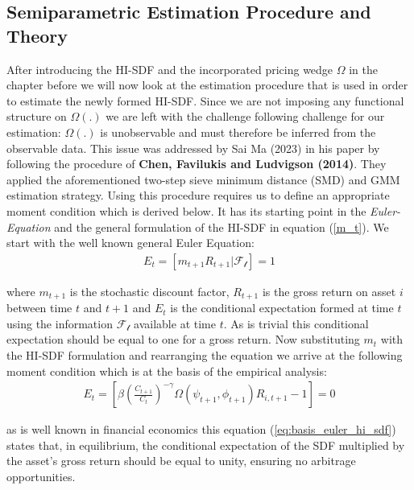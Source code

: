 \documentclass[12pt,a4paper]{article}
\begin{document}
	



	\subsection{Semiparametric Estimation Procedure and Theory}

	After introducing the HI-SDF and the incorporated pricing wedge $\Omega$ in the chapter before we will now look at the estimation procedure that is used in order to estimate the newly formed HI-SDF. Since we are not imposing any functional structure on $\Omega(.)$ we are left with the challenge following challenge for our estimation: $\Omega(.)$ is unobservable and must therefore be inferred from the observable data. This issue was addressed by Sai Ma (2023) in his paper by following the procedure of \textbf{Chen, Favilukis and Ludvigson (2014)}. They applied the aforementioned two-step sieve minimum distance (SMD) and GMM estimation strategy. Using this procedure requires us to define an appropriate moment condition which is derived below. It has its starting point in the \textit{Euler-Equation} and the general formulation of the HI-SDF in equation (\ref{m_t}). 
	We start with the well known general Euler Equation:
	\begin{align}
	E_t = [m_{t+1} R_{t+1} | \mathcal{F_t}] = 1
	\label{eq:basis_euler}
	\end{align}
	
	where $m_{t+1}$ is the stochastic discount factor, $R_{t+1}$ is the gross return on asset $i$ between time $t$ and $t + 1$ and $E_t$ is the conditional expectation formed at time $t$ using the information $\mathcal{F_t}$ available at time $t$. As is trivial this conditional expectation should be equal to one for a gross return. Now substituting $m_t$ with the HI-SDF formulation and rearranging the equation we arrive at the following moment condition which is at the basis of the empirical analysis:
	\begin{align}
		E_t = \left[ \beta \left( \frac{C_{t+1}}{C_t} \right)^{-\gamma}  \Omega(\psi_{t+1}, \phi_{t+1}) R_{i, t+1} -1 \right] = 0
		\label{eq:basis_euler_hi_sdf}
	\end{align}
	
	as is well known in financial economics this equation (\ref{eq:basis_euler_hi_sdf}) states that, in equilibrium, the conditional expectation of the SDF multiplied by the asset's gross return should be equal to unity, ensuring no arbitrage opportunities.
		
\end{document}
